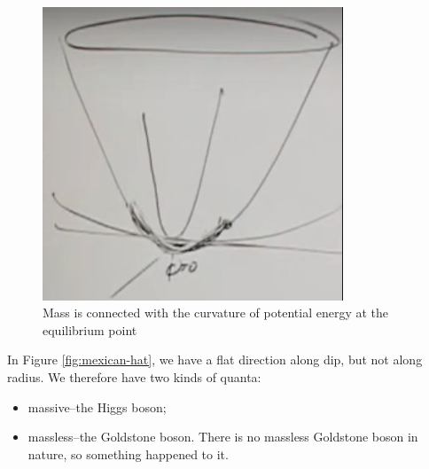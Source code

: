 \documentclass[]{article}
\begin{document}
\begin{figure}[H]
	\caption[Mass is connected with the curvature of potential energy]{Mass is connected with the curvature of potential energy at the equilibrium point}\label{fig:2-8-pe}
	\includegraphics[width=0.8\textwidth]{2-8-pe}
\end{figure}

In Figure \ref{fig:mexican-hat}, we have a flat direction along dip, but not along radius. We therefore have two kinds of quanta:
\begin{itemize}
	\item massive--the Higgs boson;
	\item massless--the Goldstone boson. There is no massless Goldstone boson in nature, so something happened to it.
\end{itemize}
\end{document}
